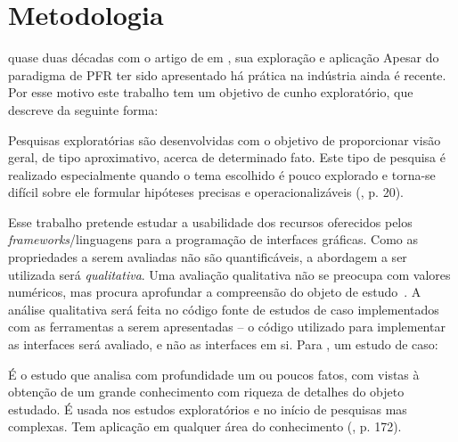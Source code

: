\section{Metodologia}\label{lmetodologia}


quase duas décadas com o artigo de 
em \citeyear{Elliott97franimation}, sua exploração e aplicação
Apesar do paradigma de PFR ter sido apresentado há
prática na indústria ainda é recente.
Por esse motivo este trabalho tem um objetivo de
cunho exploratório, que 
descreve da seguinte forma:

\begin{citacao}
  Pesquisas exploratórias são desenvolvidas com o
  objetivo de proporcionar visão geral, de tipo aproximativo,
  acerca de determinado fato.
  Este tipo de pesquisa é realizado especialmente quando o
  tema escolhido é pouco explorado e torna-se difícil sobre
  ele formular hipóteses precisas e operacionalizáveis
  (\citeyear{gil2010metodos}, p. 20).
\end{citacao}

Esse trabalho pretende estudar a usabilidade dos recursos
oferecidos pelos \emph{frameworks}/linguagens para a
programação de interfaces gráficas.
Como as propriedades a serem avaliadas não são quantificáveis,
a abordagem a ser utilizada será \emph{qualitativa}.
Uma avaliação qualitativa não se
preocupa com valores numéricos, mas procura aprofundar
a compreensão do objeto de estudo~\cite[p.~31]{gerhardt2009metodos}.
A análise qualitativa será feita no código fonte de estudos de caso
implementados com as ferramentas a serem apresentadas
-- o código utilizado para implementar as interfaces será
avaliado, e não as interfaces em si.
Para , um estudo de caso:

\begin{citacao}
  É o estudo que analisa com profundidade um ou poucos fatos,
  com vistas à obtenção de um grande conhecimento com riqueza
  de detalhes do objeto estudado. É usada nos estudos exploratórios
  e no início de pesquisas mas complexas. Tem aplicação em
  qualquer área do conhecimento (\citeyear{gil2010metodos}, p. 172).
\end{citacao}

